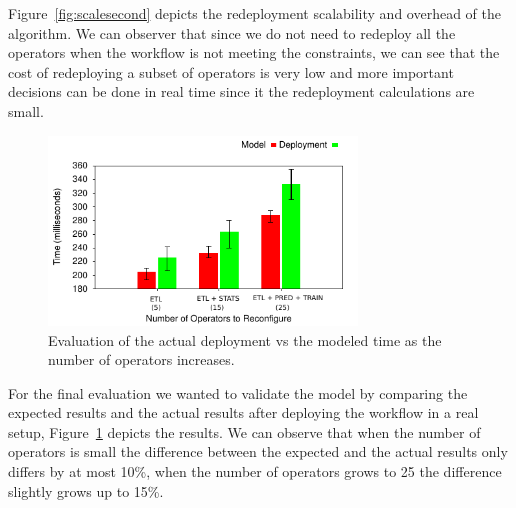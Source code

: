Figure~\ref{fig:scalesecond} depicts the redeployment scalability and overhead of the algorithm. We can observer that since we do not need to redeploy all the operators when the workflow is not meeting the constraints, we can see that the cost of redeploying a subset of operators is very low and more important decisions can be done in real time since it the redeployment calculations are small.

\begin{figure}[h!]
  \centering
  \includegraphics[width=0.73\textwidth]{Results/Time.pdf}
  \caption{Evaluation of the actual deployment vs the modeled time as the number of operators increases.}\label{fig:validation} 
\end{figure}

For the final evaluation we wanted to validate the model by comparing the expected results and the actual results after deploying the workflow in a real setup, Figure~\ref{fig:validation} depicts the results. We can observe that when the number of operators is small the difference between the expected and the actual results only differs by at most 10\%, when the number of operators grows to 25 the difference slightly grows up to 15\%.

